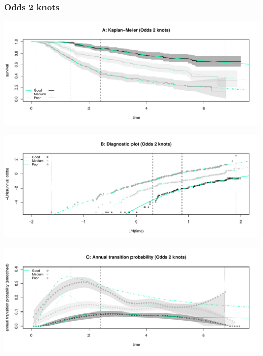 \documentclass[
]{article}
\begin{document}
\clearpage

\subsubsection{Odds 2 knots}\label{odds-2-knots}

\begin{flushleft}\includegraphics[height=0.25\textheight]{BC_OS_output/Images/Figure_spline_models-13} \end{flushleft}

\begin{flushleft}\includegraphics[height=0.25\textheight]{BC_OS_output/Images/Figure_spline_models-14} \end{flushleft}

\begin{flushleft}\includegraphics[height=0.25\textheight]{BC_OS_output/Images/Figure_spline_models-15} \end{flushleft}
\end{document}
